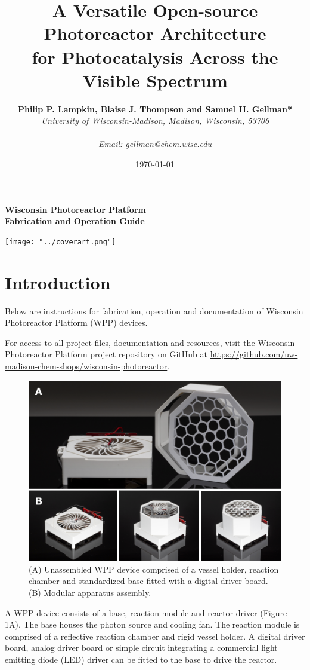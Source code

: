 \documentclass[11pt]{article}
\title{%
	\textbf{A Versatile Open-source Photoreactor Architecture\\ for Photocatalysis Across the Visible Spectrum}}
\author{\textbf{Philip P. Lampkin, Blaise J. Thompson and Samuel H. Gellman*} \\ \textit{University of Wisconsin-Madison, Madison, Wisconsin, 53706} \\ \\ \textit{Email: \href{mailto:gellman@chem.wisc.edu}{gellman@chem.wisc.edu}}}
\date{\today}
\let\stdsection\section
\renewcommand\section{\clearpage\stdsection}
\begin{document}
\maketitle
\textbf{{\centering \Large Wisconsin Photoreactor Platform \\ Fabrication and Operation Guide \\}}

\vspace{10mm} %
 
\texttt{[image: "../coverart.png"]}

\tableofcontents

\section{Introduction}

Below are instructions for fabrication, operation and documentation of Wisconsin Photoreactor Platform (WPP) devices.

For access to all project files, documentation and resources, visit the Wisconsin Photoreactor Platform project repository on GitHub at \href{https://github.com/uw-madison-chem-shops/wisconsin-photoreactor}{https://github.com/uw-madison-chem-shops/wisconsin-photoreactor}.

\begin{figure}[H]
	\includegraphics[width=\textwidth]{"./fig1.png"}
	\caption{(A) Unassembled WPP device comprised of a vessel holder, reaction chamber and standardized base fitted with a digital driver board. (B) Modular apparatus assembly.}
\end{figure}
A WPP device consists of a base, reaction module and reactor driver (Figure 1A).
The base houses the photon source and cooling fan.
The reaction module is comprised of a reflective reaction chamber and rigid vessel holder.
A digital driver board, analog driver board or simple circuit integrating a commercial light emitting diode (LED) driver can be fitted to the base to drive the reactor.
\end{document}
